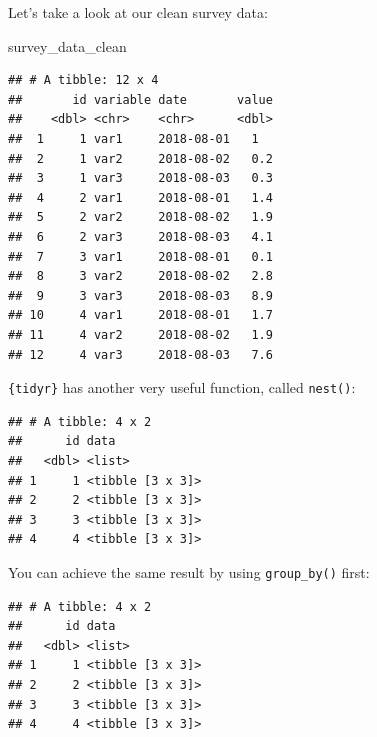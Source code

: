 \documentclass[]{gitbook}
\newenvironment{Shaded}{\begin{snugshade}}{\end{snugshade}}
\newcommand{\KeywordTok}[1]{\textcolor[rgb]{0.13,0.29,0.53}{\textbf{#1}}}
\newcommand{\NormalTok}[1]{#1}
\newcommand{\OperatorTok}[1]{\textcolor[rgb]{0.81,0.36,0.00}{\textbf{#1}}}
\newcommand{\StringTok}[1]{\textcolor[rgb]{0.31,0.60,0.02}{#1}}
\theoremstyle{definition}
\theoremstyle{definition}
\theoremstyle{definition}
\theoremstyle{remark}
\begin{document}
Let's take a look at our clean survey data:

\begin{Shaded}
\begin{Highlighting}[]
\NormalTok{survey_data_clean}
\end{Highlighting}
\end{Shaded}

\begin{verbatim}
## # A tibble: 12 x 4
##       id variable date       value
##    <dbl> <chr>    <chr>      <dbl>
##  1     1 var1     2018-08-01   1  
##  2     1 var2     2018-08-02   0.2
##  3     1 var3     2018-08-03   0.3
##  4     2 var1     2018-08-01   1.4
##  5     2 var2     2018-08-02   1.9
##  6     2 var3     2018-08-03   4.1
##  7     3 var1     2018-08-01   0.1
##  8     3 var2     2018-08-02   2.8
##  9     3 var3     2018-08-03   8.9
## 10     4 var1     2018-08-01   1.7
## 11     4 var2     2018-08-02   1.9
## 12     4 var3     2018-08-03   7.6
\end{verbatim}

\texttt{\{tidyr\}} has another very useful function, called
\texttt{nest()}:

\begin{Shaded}
\end{Shaded}

\begin{verbatim}
## # A tibble: 4 x 2
##      id data            
##   <dbl> <list>          
## 1     1 <tibble [3 x 3]>
## 2     2 <tibble [3 x 3]>
## 3     3 <tibble [3 x 3]>
## 4     4 <tibble [3 x 3]>
\end{verbatim}

You can achieve the same result by using \texttt{group\_by()} first:

\begin{Shaded}
\end{Shaded}

\begin{verbatim}
## # A tibble: 4 x 2
##      id data            
##   <dbl> <list>          
## 1     1 <tibble [3 x 3]>
## 2     2 <tibble [3 x 3]>
## 3     3 <tibble [3 x 3]>
## 4     4 <tibble [3 x 3]>
\end{verbatim}
\end{document}
